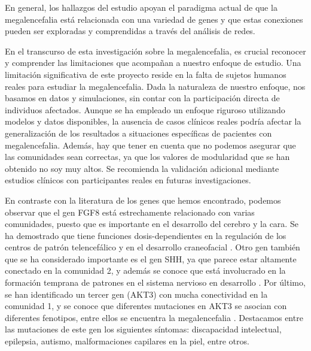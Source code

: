 En general, los hallazgos del estudio apoyan el paradigma actual de que la megalencefalia está relacionada con una variedad de genes y que estas conexiones pueden ser exploradas y comprendidas a través del análisis de redes.

En el transcurso de esta investigación sobre la megalencefalia, es crucial reconocer y comprender las limitaciones que acompañan a nuestro enfoque de estudio. Una limitación significativa de este proyecto reside en la falta de sujetos humanos reales para estudiar la megalencefalia. Dada la naturaleza de nuestro enfoque, nos basamos en datos y simulaciones, sin contar con la participación directa de individuos afectados. Aunque se ha empleado un enfoque riguroso utilizando modelos y datos disponibles, la ausencia de casos clínicos reales podría afectar la generalización de los resultados a situaciones específicas de pacientes con megalencefalia. Además, hay que tener en cuenta que no podemos asegurar que las comunidades sean correctas, ya que los valores de modularidad que se han obtenido no soy muy altos. Se recomienda la validación adicional mediante estudios clínicos con participantes reales en futuras investigaciones. 





En contraste con la literatura de los genes que hemos encontrado, podemos observar que el gen FGF8 está estrechamente relacionado con varias comunidades, puesto que es importante en el desarrollo del cerebro y la cara. Se ha demostrado que tiene funciones dosis-dependientes en la regulación de los centros de patrón telencefálico y en el desarrollo craneofacial \cite{fgf8}. Otro gen también que se ha considerado importante es el gen SHH, ya que parece estar altamente conectado en la comunidad 2, y además se conoce que está involucrado en la formación temprana de patrones en el sistema nervioso en desarrollo \cite{winden_megalencephaly_2015}. Por último, se han identificado un tercer gen (AKT3) con mucha conectividad en la comunidad 1, y se conoce que diferentes mutaciones en AKT3 se asocian con diferentes fenotipos, entre ellos se encuentra la megalencefalia \cite{akt3}. Destacamos entre las mutaciones de este gen los siguientes síntomas: discapacidad intelectual, epilepsia, autismo, malformaciones capilares en la piel, entre otros.

